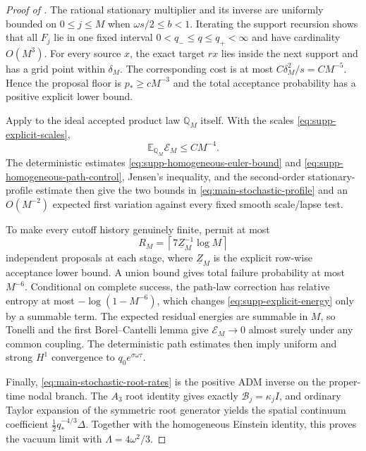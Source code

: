 \documentclass[11pt]{article}
\numberwithin{equation}{section}
\theoremstyle{definition}
\theoremstyle{remark}
\begin{document}
\begin{proof}[Proof of ]
The rational stationary multiplier and its inverse are uniformly bounded on
$0\le j\le M$ when $\omega s/2\le b<1$.  Iterating the support recursion shows
that all $F_j$ lie in one fixed interval $0<q_-\le q\le q_+<\infty$ and have
cardinality $O(M^3)$.  For every source $x$, the exact target $rx$ lies inside
the next support and has a grid point within $\delta_M$.  The corresponding
cost is at most
$C\delta_M^2/s=CM^{-5}$.  Hence the proposal floor is $p_*\ge cM^{-3}$ and the
total acceptance probability has a positive explicit lower bound.

Apply  to the ideal accepted product law
$\mathbb Q_M$ itself.  With the scales
\eqref{eq:supp-explicit-scales},
\begin{equation}
 \mathbb E_{\mathbb Q_M}\mathcal E_M\le CM^{-4}.
 \label{eq:supp-explicit-energy}
\end{equation}
The deterministic estimates
\eqref{eq:supp-homogeneous-euler-bound} and
\eqref{eq:supp-homogeneous-path-control}, Jensen's inequality, and the
second-order stationary-profile estimate then give the two bounds in
\eqref{eq:main-stochastic-profile} and an $O(M^{-2})$ expected first variation
against every fixed smooth scale/lapse test.

To make every cutoff history genuinely finite, permit at most
\[
 R_M=\left\lceil7\underline Z_M^{-1}\log M\right\rceil
\]
independent proposals at each stage, where $\underline Z_M$ is the explicit
row-wise acceptance lower bound.  A union bound gives total failure probability
at most $M^{-6}$.  Conditional on complete success, the path-law correction has
relative entropy at most $-\log(1-M^{-6})$, which changes
\eqref{eq:supp-explicit-energy} only by a summable term.  The expected residual
energies are summable in $M$, so Tonelli and the first Borel--Cantelli lemma give
$\mathcal E_M\to0$ almost surely under any common coupling.  The deterministic
path estimates then imply uniform and strong $H^1$ convergence to
$q_0e^{\sigma\omega\tau}$.

Finally, \eqref{eq:main-stochastic-root-rates} is the positive ADM inverse on
the proper-time nodal branch.  The $A_3$ root identity gives exactly
$\mathcal B_j=\kappa_jI$, and ordinary Taylor expansion of the symmetric root
generator yields the spatial continuum coefficient
$\tfrac12q_*^{-4/3}\Delta$.  Together with the homogeneous Einstein identity,
this proves the vacuum limit with $\Lambda=4\omega^2/3$.
\end{proof}
\end{document}
